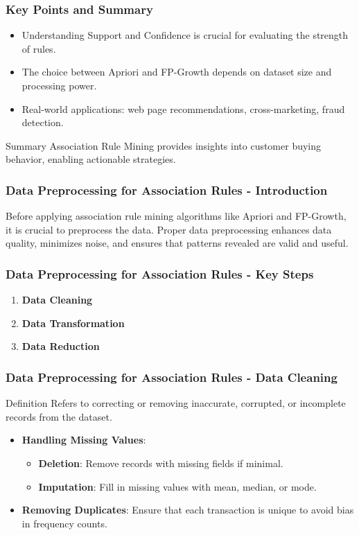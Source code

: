 \documentclass{beamer}
\begin{document}
\begin{frame}[fragile]
    \frametitle{Key Points and Summary}
    \begin{itemize}
        \item Understanding Support and Confidence is crucial for evaluating the strength of rules.
        \item The choice between Apriori and FP-Growth depends on dataset size and processing power.
        \item Real-world applications: web page recommendations, cross-marketing, fraud detection.
    \end{itemize}
    
    \begin{block}{Summary}
        Association Rule Mining provides insights into customer buying behavior, enabling actionable strategies.
    \end{block}
\end{frame}

\begin{frame}[fragile]
    \frametitle{Data Preprocessing for Association Rules - Introduction}
    Before applying association rule mining algorithms like Apriori and FP-Growth, it is crucial to preprocess the data. Proper data preprocessing enhances data quality, minimizes noise, and ensures that patterns revealed are valid and useful.
\end{frame}

\begin{frame}[fragile]
    \frametitle{Data Preprocessing for Association Rules - Key Steps}
    \begin{enumerate}
        \item \textbf{Data Cleaning}
        \item \textbf{Data Transformation}
        \item \textbf{Data Reduction}
    \end{enumerate}
\end{frame}

\begin{frame}[fragile]
    \frametitle{Data Preprocessing for Association Rules - Data Cleaning}
    \begin{block}{Definition}
        Refers to correcting or removing inaccurate, corrupted, or incomplete records from the dataset.
    \end{block}

    \begin{itemize}
        \item \textbf{Handling Missing Values}:
            \begin{itemize}
                \item \textbf{Deletion}: Remove records with missing fields if minimal.
                \item \textbf{Imputation}: Fill in missing values with mean, median, or mode.
            \end{itemize}
        \item \textbf{Removing Duplicates}: Ensure that each transaction is unique to avoid bias in frequency counts.
    \end{itemize}
\end{frame}
\end{document}
